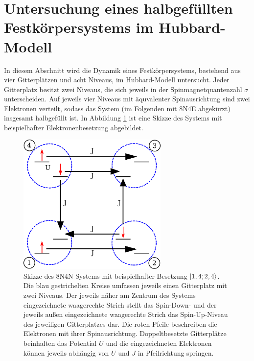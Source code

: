 \section{Untersuchung eines halbgefüllten Festkörpersystems im Hubbard-Modell}
\label{sec:untersuchunghubb}

In diesem Abschnitt wird die Dynamik eines Festkörpersystems, bestehend aus vier Gitterplätzen und acht Niveaus, im Hubbard-Modell untersucht.
Jeder Gitterplatz besitzt zwei Niveaus, die sich jeweils in der Spinmagnetquantenzahl $\sigma$ unterscheiden.
Auf jeweils vier Niveaus mit äquvalenter Spinausrichtung sind zwei Elektronen verteilt, sodass das System (im Folgenden mit 8N4E abgekürzt) insgesamt halbgefüllt ist.
In Abbildung \ref{fig:hubbsystem} ist eine Skizze des Systems mit beispielhafter Elektronenbesetzung abgebildet.

\begin{figure}
  \centering
  \includegraphics[height = 7cm]{Graphiken/hubb_system.pdf}
  \caption{Skizze des 8N4N-Systems mit beispielhafter Besetzung $\ket{1,4;2,4}$. Die blau gestrichelten Kreise umfassen jeweils einen Gitterplatz mit zwei Niveaus.
  Der jeweils näher am Zentrum des Systems eingezeichnete waagerechte Strich stellt das Spin-Down- und der jeweils außen eingezeichnete waagerechte Strich das Spin-Up-Niveau des jeweiligen Gitterplatzes dar. Die roten Pfeile beschreiben die Elektronen mit ihrer Spinausrichtung.
  Doppeltbesetzte Gitterplätze beinhalten das Potential $U$ und die eingezeichneten Elektronen können jeweils abhängig von $U$ und $J$ in Pfeilrichtung springen.}
  \label{fig:hubbsystem}
\end{figure}

